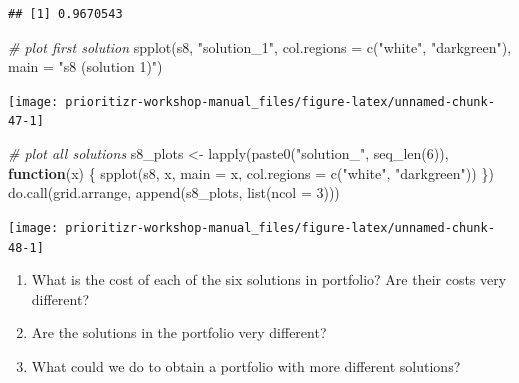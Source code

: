 \documentclass[
  12pt,
]{book}
\makeatletter
\newenvironment{Shaded}{\begin{snugshade}}{\end{snugshade}}
\newcommand{\AttributeTok}[1]{\textcolor[rgb]{0.77,0.63,0.00}{#1}}
\newcommand{\CommentTok}[1]{\textcolor[rgb]{0.56,0.35,0.01}{\textit{#1}}}
\newcommand{\ControlFlowTok}[1]{\textcolor[rgb]{0.13,0.29,0.53}{\textbf{#1}}}
\newcommand{\DecValTok}[1]{\textcolor[rgb]{0.00,0.00,0.81}{#1}}
\newcommand{\FunctionTok}[1]{\textcolor[rgb]{0.00,0.00,0.00}{#1}}
\newcommand{\NormalTok}[1]{#1}
\newcommand{\OtherTok}[1]{\textcolor[rgb]{0.56,0.35,0.01}{#1}}
\newcommand{\StringTok}[1]{\textcolor[rgb]{0.31,0.60,0.02}{#1}}
\providecommand{\tightlist}{%
  \setlength{\itemsep}{0pt}\setlength{\parskip}{0pt}}
\newenvironment{kframe}{%
\medskip{}
\setlength{\fboxsep}{.8em}
 \def\at@end@of@kframe{}%
 \ifinner\ifhmode%
  \def\at@end@of@kframe{\end{minipage}}%
  \begin{minipage}{\columnwidth}%
 \fi\fi%
 \def\FrameCommand##1{\hskip\@totalleftmargin \hskip-\fboxsep
 \colorbox{shadecolor}{##1}\hskip-\fboxsep
     \hskip-\linewidth \hskip-\@totalleftmargin \hskip\columnwidth}%
 \MakeFramed {\advance\hsize-\width
   \@totalleftmargin\z@ \linewidth\hsize
   \@setminipage}}%
 {\par\unskip\endMakeFramed%
 \at@end@of@kframe}
\newenvironment{rmdblock}[1]
  {
  \begin{itemize}
  \renewcommand{\labelitemi}{
    \raisebox{-.7\height}[0pt][0pt]{
      {\setkeys{Gin}{width=3em,keepaspectratio}\texttt{[image: images/\#1]}}
    }
  }
  \setlength{\fboxsep}{1em}
  \begin{kframe}
  \item
  }
  {
  \end{kframe}
  \end{itemize}
  }
\newenvironment{rmdquestion}
  {\begin{rmdblock}{question}}
  {\end{rmdblock}}
\makeatother
\begin{document}
\begin{verbatim}
## [1] 0.9670543
\end{verbatim}

\begin{Shaded}
\begin{Highlighting}[]
\CommentTok{\# plot first solution}
\FunctionTok{spplot}\NormalTok{(s8, }\StringTok{"solution\_1"}\NormalTok{, }\AttributeTok{col.regions =} \FunctionTok{c}\NormalTok{(}\StringTok{"white"}\NormalTok{, }\StringTok{"darkgreen"}\NormalTok{),}
       \AttributeTok{main =} \StringTok{"s8 (solution 1)"}\NormalTok{)}
\end{Highlighting}
\end{Shaded}

\begin{center}\texttt{[image: prioritizr-workshop-manual\_files/figure-latex/unnamed-chunk-47-1]} \end{center}

\clearpage

\begin{Shaded}
\begin{Highlighting}[]
\CommentTok{\# plot all solutions}
\NormalTok{s8\_plots }\OtherTok{\textless{}{-}} \FunctionTok{lapply}\NormalTok{(}\FunctionTok{paste0}\NormalTok{(}\StringTok{"solution\_"}\NormalTok{, }\FunctionTok{seq\_len}\NormalTok{(}\DecValTok{6}\NormalTok{)), }\ControlFlowTok{function}\NormalTok{(x) \{}
  \FunctionTok{spplot}\NormalTok{(s8, x, }\AttributeTok{main =}\NormalTok{ x, }\AttributeTok{col.regions =} \FunctionTok{c}\NormalTok{(}\StringTok{"white"}\NormalTok{, }\StringTok{"darkgreen"}\NormalTok{))}
\NormalTok{\})}
\FunctionTok{do.call}\NormalTok{(grid.arrange, }\FunctionTok{append}\NormalTok{(s8\_plots, }\FunctionTok{list}\NormalTok{(}\AttributeTok{ncol =} \DecValTok{3}\NormalTok{)))}
\end{Highlighting}
\end{Shaded}

\begin{center}\texttt{[image: prioritizr-workshop-manual\_files/figure-latex/unnamed-chunk-48-1]} \end{center}

\begin{rmdquestion}
\begin{enumerate}
\def\labelenumi{\arabic{enumi}.}
\tightlist
\item
  What is the cost of each of the six solutions in portfolio? Are their costs very different?
\item
  Are the solutions in the portfolio very different?
\item
  What could we do to obtain a portfolio with more different solutions?
\end{enumerate}
\end{rmdquestion}
\end{document}
